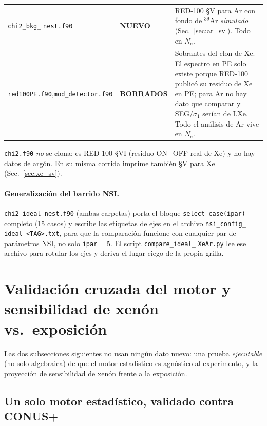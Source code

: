 \documentclass[11pt,a4paper]{article}
\newcommand{\Ne}{N_{e}}
\newcommand{\code}[1]{\texttt{#1}}
\begin{document}
\begin{center}
\begin{tabular}{@{}>{\raggedright\arraybackslash}p{3.1cm}
                   >{\raggedright\arraybackslash}p{3.5cm}
                   >{\raggedright\arraybackslash}p{7.6cm}@{}}
\code{chi2\_bkg\_} \code{nest.f90} & \textbf{NUEVO} &
  RED-100 \S V para Ar con fondo de $^{39}$Ar \emph{simulado}
  (Sec.~\ref{sec:ar_sv}). Todo en $\Ne$. \\
\code{red100PE.f90},\newline\code{mod\_detector.f90} & \textbf{BORRADOS} &
  Sobrantes del clon de Xe. El espectro en PE solo existe porque RED-100
  public\'o su residuo de Xe en PE; para Ar no hay dato que comparar y
  SEG/$\sigma_{1}$ ser\'ian de LXe. Todo el an\'alisis de Ar vive en $\Ne$. \\
\bottomrule
\end{tabular}
\end{center}

\code{chi2.f90} \emph{no} se clona: es RED-100 \S VI (residuo ON$-$OFF real de Xe)
y no hay datos de arg\'on. En su misma corrida imprime tambi\'en \S V para Xe
(Sec.~\ref{sec:xe_sv}).

\paragraph{Generalizaci\'on del barrido NSI.} \code{chi2\_ideal\_nest.f90}
(ambas carpetas) porta el bloque \code{select case(ipar)} completo (15 casos) y
escribe las etiquetas de ejes en el archivo
\code{nsi\_config\_} \code{ideal\_<TAG>.txt}, para que la comparaci\'on funcione
con cualquier par de par\'ametros NSI, no solo \code{ipar}$=5$. El script
\code{compare\_ideal\_} \code{XeAr.py} lee ese archivo para rotular los ejes y
deriva el lugar ciego de la propia grilla.

\section{Validaci\'on cruzada del motor y sensibilidad de xen\'on vs.\ exposici\'on}
\label{sec:extensiones}

Las dos subsecciones siguientes no usan ning\'un dato nuevo: una prueba
\emph{ejecutable} (no solo algebraica) de que el motor estad\'istico es
agn\'ostico al experimento, y la proyecci\'on de sensibilidad de xen\'on frente a
la exposici\'on.

\subsection{Un solo motor estad\'istico, validado contra CONUS+}
\label{sec:validacion_cruzada}
\end{document}
